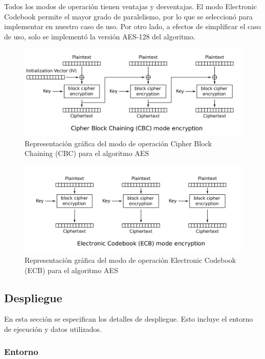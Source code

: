 \documentclass[11pt]{article}
\let\Oldsubsection\subsection
\renewcommand{\subsection}{\FloatBarrier\Oldsubsection}
\let\Oldsubsubsection\subsubsection
\renewcommand{\subsubsection}{\FloatBarrier\Oldsubsubsection}
\begin{document}
Todos los modos de operación tienen ventajas y desventajas. El modo Electronic Codebook permite el mayor grado de paralelismo, por lo que se seleccionó para implementar en nuestro caso de uso. Por otro lado, a efectos de simplificar el caso de uso, solo se implementó la versión AES-128 del algoritmo.

\begin{figure}[h]
    \centering
    \includegraphics[scale=0.2]{resources/aes/cbc.png}
    \caption{Representación gráfica del modo de operación Cipher Block Chaining (CBC) para el algoritmo AES}
    \label{fig:aes_cbc}
\end{figure}

\begin{figure}[h]
    \centering
    \includegraphics[scale=0.2]{resources/aes/ecb.png}
    \caption{Representación gráfica del modo de operación Electronic Codebook (ECB) para el algoritmo AES}
    \label{fig:aes_ecb}
\end{figure}

\subsection{Despliegue}

En esta sección se especifican los detalles de despliegue. Esto incluye el entorno de ejecución y datos utilizados.

\subsubsection{Entorno}
\end{document}
